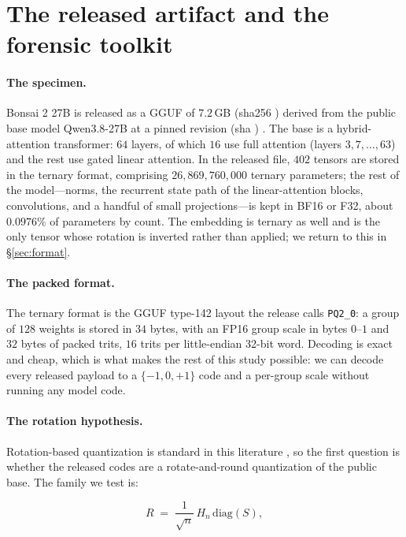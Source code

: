 \section{The released artifact and the forensic toolkit}
\label{sec:artifact}

\paragraph{The specimen.}
Bonsai 2 27B is released as a GGUF of $7.2$\,GB
(sha256 ) derived from the public base model
Qwen3.8-27B at a pinned revision (sha )
\citep{prismbonsai2,qwen38}. The base is a hybrid-attention transformer:
$64$ layers, of which $16$ use full attention (layers $3,7,\dots,63$) and the
rest use gated linear attention. In the released file, $402$ tensors are stored
in the ternary format, comprising $26{,}869{,}760{,}000$ ternary parameters;
the rest of the model---norms, the recurrent state path of the linear-attention
blocks, convolutions, and a handful of small projections---is kept in BF16 or
F32, about $0.0976\%$ of parameters by count. The embedding is ternary as well
and is the only tensor whose rotation is inverted rather than applied; we
return to this in \S\ref{sec:format}.

\paragraph{The packed format.}
The ternary format is the GGUF type-142 layout the release calls
\texttt{PQ2\_0}: a group of $128$ weights is stored in $34$ bytes, with an FP16
group scale in bytes $0$--$1$ and $32$ bytes of packed trits, $16$ trits per
little-endian 32-bit word. Decoding is exact and cheap, which is what makes the
rest of this study possible: we can decode every released payload to a
$\{-1,0,+1\}$ code and a per-group scale without running any model code.

\paragraph{The rotation hypothesis.}
Rotation-based quantization is standard in this literature
\citep{quip,quipsharp,quarot,spinquant}, so the first question is whether the
released codes are a rotate-and-round quantization of the public base. The
family we test is:

\begin{equation}
  R \;=\; \frac{1}{\sqrt{n}}\, H_n \, \mathrm{diag}(S),
  \label{eq:rotation}
\end{equation}

